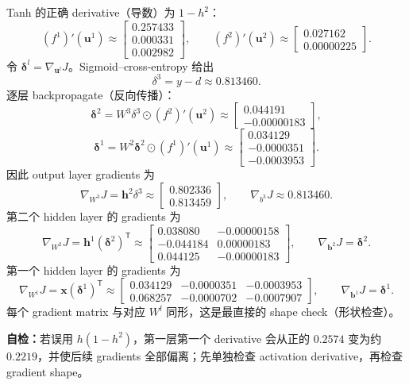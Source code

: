 \begin{checkedsolution}
Tanh 的正确 derivative（导数）为 $1-h^2$：
\[
  (f^1)'(\bm u^1)\approx
  \begin{bmatrix}0.257433\\0.000331\\0.002982\end{bmatrix},
  \qquad
  (f^2)'(\bm u^2)\approx
  \begin{bmatrix}0.027162\\0.00000225\end{bmatrix}.
\]
令 $\bm\delta^l=\nabla_{\bm u^l}J$。Sigmoid--cross-entropy 给出
\[
  \delta^3=y-d\approx0.813460.
\]
逐层 backpropagate（反向传播）：
\[
  \bm\delta^2
  =W^3\delta^3\odot(f^2)'(\bm u^2)
  \approx\begin{bmatrix}0.044191\\-0.00000183\end{bmatrix},
\]
\[
  \bm\delta^1
  =W^2\bm\delta^2\odot(f^1)'(\bm u^1)
  \approx\begin{bmatrix}
    0.034129\\-0.0000351\\-0.0003953
  \end{bmatrix}.
\]
因此 output layer gradients 为
\[
  \nabla_{W^3}J=\bm h^2\delta^3
  \approx\begin{bmatrix}0.802336\\0.813459\end{bmatrix},
  \qquad
  \nabla_{b^3}J\approx0.813460.
\]
第二个 hidden layer 的 gradients 为
\[
  \nabla_{W^2}J=\bm h^1(\bm\delta^2)^{\mathsf T}
  \approx
  \begin{bmatrix}
    0.038080&-0.00000158\\
    -0.044184&0.00000183\\
    0.044125&-0.00000183
  \end{bmatrix},
  \qquad
  \nabla_{\bm b^2}J=\bm\delta^2.
\]
第一个 hidden layer 的 gradients 为
\[
  \nabla_{W^1}J=\bm x(\bm\delta^1)^{\mathsf T}
  \approx
  \begin{bmatrix}
    0.034129&-0.0000351&-0.0003953\\
    0.068257&-0.0000702&-0.0007907
  \end{bmatrix},
  \qquad
  \nabla_{\bm b^1}J=\bm\delta^1.
\]
每个 gradient matrix 与对应 $W^l$ 同形，这是最直接的 shape check（形状检查）。
\end{checkedsolution}

\textbf{自检：}若误用 $h(1-h^2)$，第一层第一个 derivative 会从正的 $0.2574$ 变为约 $0.2219$，并使后续 gradients 全部偏离；先单独检查 activation derivative，再检查 gradient shape。
